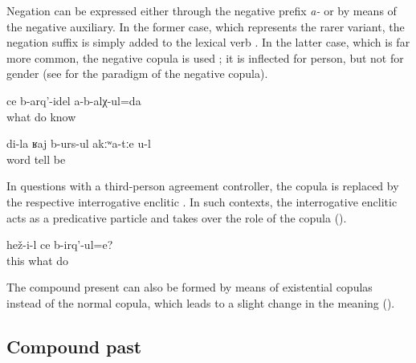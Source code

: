 Negation can be expressed either through the negative prefix \textit{a-} or by means of the negative auxiliary. In the former case, which represents the rarer variant, the negation suffix is simply added to the lexical verb . In the latter case, which is far more common, the negative copula   is used ; it is inflected for person, but not for gender (see  for the paradigm of the negative copula).
%
\begin{exe}
	\ex	\label{ex:I do not know what to do analytic}
	\gll	ce	b-arq'-idel	a-b-alχ-ul=da\\
		what	do	know\\
	\glt	{}

	\ex	\label{ex:You tell only my words analytic}
	\gll	di-la	ʁaj	b-urs-ul	akːʷa-tːe	u-l\\
			word	tell	be	\\
	\glt	{}
\end{exe}

In questions with a third-person agreement controller, the copula is replaced by the respective interrogative enclitic . In such contexts, the interrogative enclitic acts as a predicative particle and takes over the role of the copula ().
%
\begin{exe}
	\ex	\label{ex:What is he doing analytic}
	\gll	hež-i-l	ce	b-irq'-ul=e?\\
		this	what	do\\
	\glt	{}
\end{exe}

The compound present can also be formed by means of existential copulas instead of the normal copula, which leads to a slight change in the meaning ().



\subsection{Compound past}
\label{ssec:Compound past}


